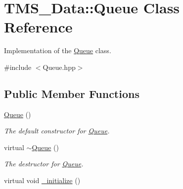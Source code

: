 \hypertarget{classTMS__Data_1_1Queue}{
\section{TMS\_\-Data::Queue Class Reference}
\label{classTMS__Data_1_1Queue}
}


Implementation of the \hyperlink{classTMS__Data_1_1Queue}{Queue} class.  




{\ttfamily \#include $<$Queue.hpp$>$}

\subsection*{Public Member Functions}
\begin{DoxyCompactItemize}
\item 
\hypertarget{classTMS__Data_1_1Queue_a66611c03e79a96fa71ded7f1c65e0ee0}{
\hyperlink{classTMS__Data_1_1Queue_a66611c03e79a96fa71ded7f1c65e0ee0}{Queue} ()}
\label{classTMS__Data_1_1Queue_a66611c03e79a96fa71ded7f1c65e0ee0}

\begin{DoxyCompactList}\small\item\em The default constructor for \hyperlink{classTMS__Data_1_1Queue}{Queue}. \item\end{DoxyCompactList}\item 
\hypertarget{classTMS__Data_1_1Queue_ab2eacf61837808e170016bbd94ac5fbf}{
virtual \hyperlink{classTMS__Data_1_1Queue_ab2eacf61837808e170016bbd94ac5fbf}{$\sim$Queue} ()}
\label{classTMS__Data_1_1Queue_ab2eacf61837808e170016bbd94ac5fbf}

\begin{DoxyCompactList}\small\item\em The destructor for \hyperlink{classTMS__Data_1_1Queue}{Queue}. \item\end{DoxyCompactList}\item 
\hypertarget{classTMS__Data_1_1Queue_a1b0f485f037653448d0f5838992d1937}{
virtual void \hyperlink{classTMS__Data_1_1Queue_a1b0f485f037653448d0f5838992d1937}{\_\-initialize} ()}
\label{classTMS__Data_1_1Queue_a1b0f485f037653448d0f5838992d1937}


\end{DoxyCompactItemize}

